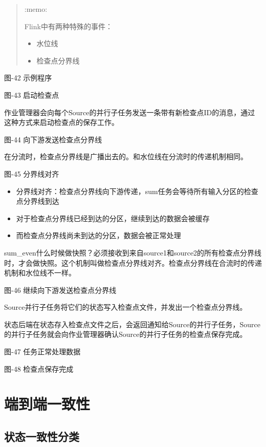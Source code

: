 \begin{quote}
:memo:

Flink中有两种特殊的事件：

\begin{itemize}
\tightlist
\item
  水位线
\item
  检查点分界线
\end{itemize}
\end{quote}

图-42 示例程序

图-43 启动检查点

作业管理器会向每个Source的并行子任务发送一条带有新检查点ID的消息，通过这种方式来启动检查点的保存工作。

图-44 向下游发送检查点分界线

在分流时，检查点分界线是广播出去的。和水位线在分流时的传递机制相同。

图-45 分界线对齐

\begin{itemize}
\tightlist
\item
  分界线对齐：检查点分界线向下游传递，sum任务会等待所有输入分区的检查点分界线到达
\item
  对于检查点分界线已经到达的分区，继续到达的数据会被缓存
\item
  而检查点分界线尚未到达的分区，数据会被正常处理
\end{itemize}

sum\_even什么时候做快照？必须接收到来自source1和source2的所有检查点分界线时，才会做快照。这个机制叫做{检查点分界线对齐}。检查点分界线在合流时的传递机制和水位线不一样。

图-46 继续向下游发送检查点分界线

Source并行子任务将它们的状态写入检查点文件，并发出一个检查点分界线。

状态后端在状态存入检查点文件之后，会返回通知给Source的并行子任务，Source的并行子任务就会向作业管理器确认Source的并行子任务的检查点保存完成。

图-47 任务正常处理数据

图-48 检查点保存完成

\hypertarget{ux7aefux5230ux7aefux4e00ux81f4ux6027}{%
\section{端到端一致性}\label{ux7aefux5230ux7aefux4e00ux81f4ux6027}}

\hypertarget{ux72b6ux6001ux4e00ux81f4ux6027ux5206ux7c7b}{%
\subsection{状态一致性分类}\label{ux72b6ux6001ux4e00ux81f4ux6027ux5206ux7c7b}}

